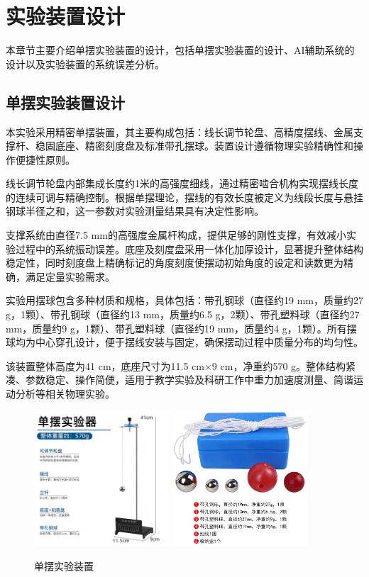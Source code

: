 \section{实验装置设计}
本章节主要介绍单摆实验装置的设计，包括单摆实验装置的设计、AI辅助系统的设计以及实验装置的系统误差分析。
\subsection{单摆实验装置设计}

本实验采用精密单摆装置，其主要构成包括：线长调节轮盘、高精度摆线、金属支撑杆、稳固底座、精密刻度盘及标准带孔摆球。装置设计遵循物理实验精确性和操作便捷性原则。

线长调节轮盘内部集成长度约1米的高强度细线，通过精密啮合机构实现摆线长度的连续可调与精确控制。根据单摆理论，摆线的有效长度被定义为线段长度与悬挂钢球半径之和，这一参数对实验测量结果具有决定性影响。

支撑系统由直径7.5 mm的高强度金属杆构成，提供足够的刚性支撑，有效减小实验过程中的系统振动误差。底座及刻度盘采用一体化加厚设计，显著提升整体结构稳定性，同时刻度盘上精确标记的角度刻度使摆动初始角度的设定和读数更为精确，满足定量实验需求。

实验用摆球包含多种材质和规格，具体包括：带孔钢球（直径约19 mm，质量约27 g，1颗）、带孔钢球（直径约13 mm，质量约6.5 g，2颗）、带孔塑料球（直径约27 mm，质量约9 g，1颗）、带孔塑料球（直径约19 mm，质量约4 g，1颗）。所有摆球均为中心穿孔设计，便于摆线安装与固定，确保摆动过程中质量分布的均匀性。

该装置整体高度为41 cm，底座尺寸为11.5 cm×9 cm，净重约570 g。整体结构紧凑、参数稳定、操作简便，适用于教学实验及科研工作中重力加速度测量、简谐运动分析等相关物理实验。
\begin{figure}[H]
    \centering
    \includegraphics[width=0.45\textwidth]{figures/单摆实验装置1.jpg}
    \includegraphics[width=0.45\textwidth]{figures/单摆实验装置2.jpg}
    \caption{单摆实验装置}
    \label{fig:pendulum_device}
\end{figure}

